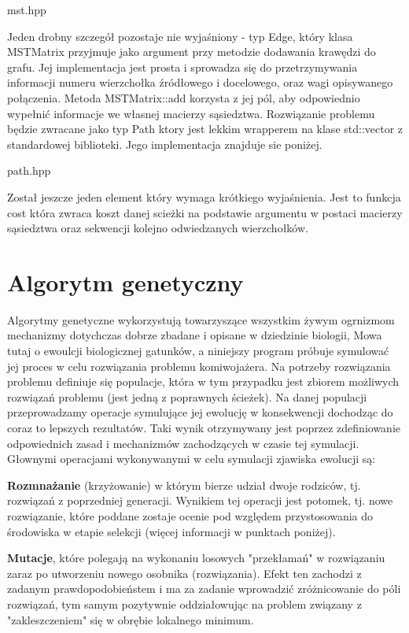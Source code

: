 \documentclass[polish,polish,a4paper]{article}
\begin{document}

{mst.hpp}

Jeden drobny szczegół pozostaje nie wyjaśniony - typ Edge, który klasa MSTMatrix przyjmuje jako argument przy metodzie dodawania krawędzi do grafu.
Jej implementacja jest prosta i sprowadza się do przetrzymywania informacji numeru wierzchołka źródłowego i docelowego, oraz wagi opisywanego połączenia.
Metoda MSTMatrix::add korzysta z jej pól, aby odpowiednio wypełnić informacje we własnej macierzy sąsiedztwa.
Rozwiązanie problemu będzie zwracane jako typ Path ktory jest lekkim wrapperem na klase std::vector z standardowej biblioteki.
Jego implementacja znajduje sie poniżej.


{path.hpp}

Został jeszcze jeden element który wymaga krótkiego wyjaśnienia. Jest to funkcja cost która zwraca koszt danej scieżki na podstawie argumentu w postaci macierzy sąsiedztwa
oraz sekwencji kolejno odwiedzanych wierzchołków.

\section{Algorytm genetyczny}
\par Algorytmy genetyczne wykorzystują towarzyszące wszystkim żywym ogrnizmom mechanizmy dotychczas dobrze zbadane i opisane w dziedzinie biologii,
Mowa tutaj o ewoulcji biologicznej gatunków, a niniejszy program próbuje symulować jej proces w celu rozwiązania problemu komiwojażera.
Na potrzeby rozwiązania problemu definiuje się populacje, która w tym przypadku  jest zbiorem możliwych rozwiązań problemu
(jest jedną z poprawnych ścieżek).
Na danej populacji przeprowadzamy operacje symulujące jej ewolucję w konsekwencji dochodząc do coraz to lepszych rezultatów. Taki wynik otrzymywany jest
poprzez zdefiniowanie odpowiednich zasad i mechanizmów zachodzących w czasie tej symulacji. Głownymi operacjami wykonywanymi w celu symulacji zjawiska
ewolucji są:

\par \textbf{Rozmnażanie}
(krzyżowanie) w którym bierze udział dwoje rodziców, tj. rozwiązań z poprzedniej generacji. Wynikiem tej operacji jest potomek, tj. nowe rozwiązanie,
które poddane zostaje ocenie pod względem przystosowania do środowiska w etapie selekcji (więcej informacji w punktach poniżej).

\par \textbf{Mutacje},
które polegają na wykonaniu losowych "przekłamań" w rozwiązaniu zaraz po utworzeniu nowego osobnika (rozwiązania).
Efekt ten zachodzi z zadanym prawdopodobieństem i ma za zadanie wprowadzić zróżnicowanie do póli rozwiązań, tym samym pozytywnie oddziałowując na
problem związany z "zakleszczeniem" się w obrębie lokalnego minimum.
\end{document}
